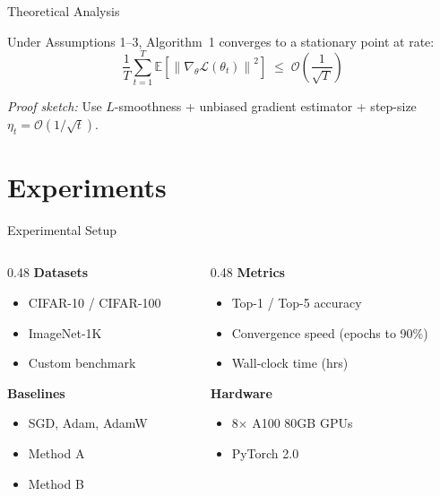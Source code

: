 \documentclass[aspectratio=169,11pt]{beamer}
\newcommand{\E}{\mathbb{E}}
\newcommand{\norm}[1]{\left\lVert#1\right\rVert}
\newcommand{\grad}{\nabla}
\begin{document}
\begin{frame}{Theoretical Analysis}
  \begin{theorem}[Convergence]
    Under Assumptions 1--3, Algorithm~1 converges to a stationary point at rate:
    \begin{equation}
      \frac{1}{T}\sum_{t=1}^{T}\E\!\left[\norm{\grad_\theta\mathcal{L}(\theta_t)}^2\right]
      \;\leq\; \mathcal{O}\!\left(\frac{1}{\sqrt{T}}\right)
    \end{equation}
  \end{theorem}
  \vspace{0.5em}
  \textit{Proof sketch:} Use $L$-smoothness + unbiased gradient estimator + step-size $\eta_t = \mathcal{O}(1/\sqrt{t})$.
\end{frame}

\section{Experiments}

\begin{frame}{Experimental Setup}
  \begin{columns}[T]
    \begin{column}{0.48\textwidth}
      \textbf{Datasets}
      \begin{itemize}
        \item CIFAR-10 / CIFAR-100
        \item ImageNet-1K
        \item Custom benchmark
      \end{itemize}
      \textbf{Baselines}
      \begin{itemize}
        \item SGD, Adam, AdamW
        \item Method A \citep{smith2020}
        \item Method B \citep{jones2021}
      \end{itemize}
    \end{column}
    \hfill
    \begin{column}{0.48\textwidth}
      \textbf{Metrics}
      \begin{itemize}
        \item Top-1 / Top-5 accuracy
        \item Convergence speed (epochs to 90\%)
        \item Wall-clock time (hrs)
      \end{itemize}
      \textbf{Hardware}
      \begin{itemize}
        \item 8× A100 80GB GPUs
        \item PyTorch 2.0
      \end{itemize}
    \end{column}
  \end{columns}
\end{frame}
\end{document}
